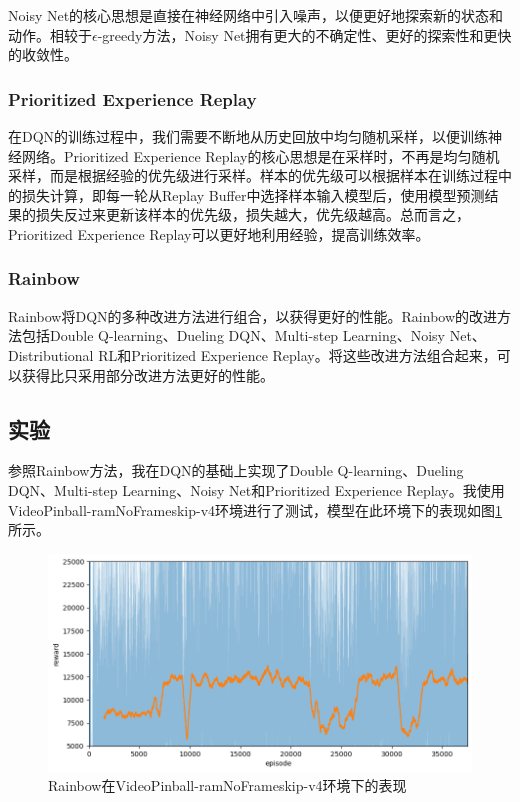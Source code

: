 \documentclass{article}
\begin{document}
Noisy Net的核心思想是直接在神经网络中引入噪声，以便更好地探索新的状态和动作。相较于$\epsilon$-greedy方法，Noisy Net拥有更大的不确定性、更好的探索性和更快的收敛性。

\subsubsection{Prioritized Experience Replay}

在DQN的训练过程中，我们需要不断地从历史回放中均匀随机采样，以便训练神经网络。Prioritized Experience Replay的核心思想是在采样时，不再是均匀随机采样，而是根据经验的优先级进行采样。样本的优先级可以根据样本在训练过程中的损失计算，即每一轮从Replay Buffer中选择样本输入模型后，使用模型预测结果的损失反过来更新该样本的优先级，损失越大，优先级越高。总而言之，Prioritized Experience Replay可以更好地利用经验，提高训练效率。

\subsubsection{Rainbow}

Rainbow将DQN的多种改进方法进行组合，以获得更好的性能。Rainbow的改进方法包括Double Q-learning、Dueling DQN、Multi-step Learning、Noisy Net、Distributional RL和Prioritized Experience Replay。将这些改进方法组合起来，可以获得比只采用部分改进方法更好的性能。

\subsection{实验}

参照Rainbow方法，我在DQN的基础上实现了Double Q-learning、Dueling DQN、Multi-step Learning、Noisy Net和Prioritized Experience Replay。我使用VideoPinball-ramNoFrameskip-v4环境进行了测试，模型在此环境下的表现如图\ref{fig:rainbow}所示。

\begin{figure}[htbp]
	\centering
	\includegraphics[width=0.8\linewidth]{fig-rainbow.png}
	\caption{Rainbow在VideoPinball-ramNoFrameskip-v4环境下的表现}
	\label{fig:rainbow}
\end{figure}
\end{document}
